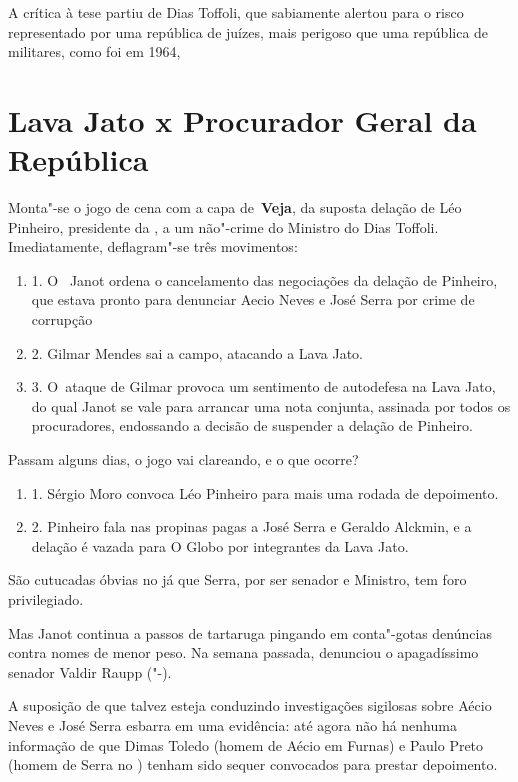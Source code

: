 A crítica à tese partiu de Dias Toffoli, que sabiamente alertou para o
risco representado por uma república de juízes, mais perigoso que uma
república de militares, como foi em 1964,

\section{Lava Jato x Procurador Geral da República}

Monta"-se o jogo de cena com a capa de~\textbf{Veja}, da suposta delação
de Léo Pinheiro, presidente da , a um não"-crime do Ministro do 
Dias Toffoli. Imediatamente, deflagram"-se três movimentos:

\begin{enumerate}
\itemsep1pt\parskip0pt
\item
  1. O~ Janot ordena o cancelamento das negociações da delação de
  Pinheiro, que estava pronto para denunciar Aecio Neves e José Serra
  por crime de corrupção~
\item
  2. Gilmar Mendes sai a campo, atacando a Lava Jato.
\item
  3. O~ataque de Gilmar provoca um sentimento de autodefesa na Lava
  Jato, do qual Janot se vale para arrancar uma nota conjunta, assinada
  por todos os procuradores, endossando a decisão de suspender a delação
  de Pinheiro.
\end{enumerate}

Passam alguns dias, o jogo vai clareando, e o que ocorre?

\begin{enumerate}
\itemsep1pt\parskip0pt
\item
  1. Sérgio Moro convoca Léo Pinheiro para mais uma rodada de
  depoimento.
\item
  2. Pinheiro fala nas propinas pagas a José Serra e Geraldo Alckmin, e
  a delação é vazada para O Globo por integrantes da Lava Jato.
\end{enumerate}

São cutucadas óbvias no  já que Serra, por ser senador e Ministro,
tem foro privilegiado.

Mas Janot continua a passos de tartaruga pingando em conta"-gotas
denúncias contra nomes de menor peso. Na semana passada, denunciou o
apagadíssimo senador Valdir Raupp ("-).

A suposição de que talvez esteja conduzindo investigações sigilosas
sobre Aécio Neves e José Serra esbarra em uma evidência: até agora não
há nenhuma informação de que Dimas Toledo (homem de Aécio em Furnas) e
Paulo Preto (homem de Serra no ) tenham sido sequer convocados para
prestar depoimento.

